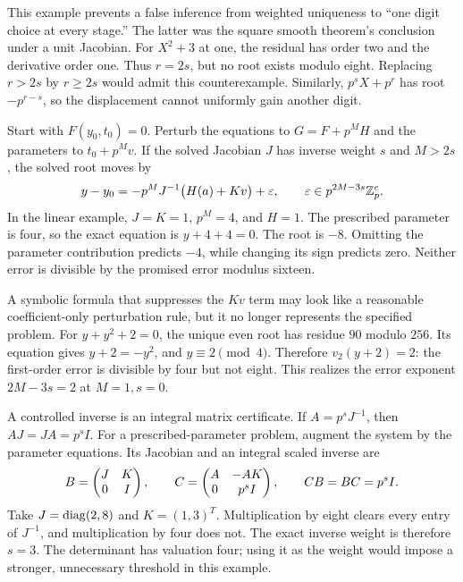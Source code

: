 This example prevents a false inference from weighted uniqueness to ``one digit choice at every stage.'' The latter was the square smooth theorem's conclusion under a unit Jacobian.
For $X^2+3$ at one, the residual has order two and the derivative order one. Thus $r=2s$, but no root exists modulo eight. Replacing $r>2s$ by $r\ge2s$ would admit this counterexample. Similarly, $p^sX+p^r$ has root $-p^{r-s}$, so the displacement cannot uniformly gain another digit.

Start with $F(y_0,t_0)=0$. Perturb the equations to $G=F+p^MH$ and the parameters to $t_0+p^Mv$. If the solved Jacobian $J$ has inverse weight $s$ and $M>2s$, the solved root moves by
\[
 y-y_0=-p^MJ^{-1}\bigl(H(a)+Kv\bigr)+\varepsilon,
 \qquad \varepsilon\in p^{2M-3s}\mathbb Z_p^e.
\]
In the linear example, $J=K=1$, $p^M=4$, and $H=1$. The prescribed parameter is four, so the exact equation is $y+4+4=0$. The root is $-8$. Omitting the parameter contribution predicts $-4$, while changing its sign predicts zero. Neither error is divisible by the promised error modulus sixteen.

A symbolic formula that suppresses the $Kv$ term may look like a reasonable coefficient-only perturbation rule, but it no longer represents the specified problem.
For $y+y^2+2=0$, the unique even root has residue $90$ modulo $256$. Its equation gives $y+2=-y^2$, and $y\equiv2\pmod4$. Therefore $v_2(y+2)=2$: the first-order error is divisible by four but not eight. This realizes the error exponent $2M-3s=2$ at $M=1,s=0$.

A controlled inverse is an integral matrix certificate. If $A=p^sJ^{-1}$, then $AJ=JA=p^sI$. For a prescribed-parameter problem, augment the system by the parameter equations. Its Jacobian and an integral scaled inverse are
\[
 B=\begin{pmatrix}J&K\\0&I\end{pmatrix},\qquad
 C=\begin{pmatrix}A&-AK\\0&p^sI\end{pmatrix},\qquad CB=BC=p^sI.
\]
Take $J=\operatorname{diag}(2,8)$ and $K=(1,3)^T$. Multiplication by eight clears every entry of $J^{-1}$, and multiplication by four does not. The exact inverse weight is therefore $s=3$. The determinant has valuation four; using it as the weight would impose a stronger, unnecessary threshold in this example.

